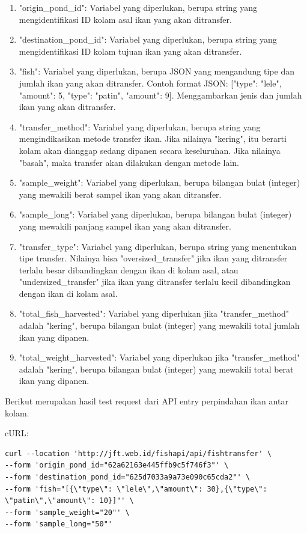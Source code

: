 \begin{enumerate}[1.]
\begin{enumerate}
\item "origin\_pond\_id": Variabel yang diperlukan, berupa string yang mengidentifikasi ID kolam asal ikan yang akan ditransfer.
\item "destination\_pond\_id": Variabel yang diperlukan, berupa string yang mengidentifikasi ID kolam tujuan ikan yang akan ditransfer.
\item "fish": Variabel yang diperlukan, berupa JSON yang mengandung tipe dan jumlah ikan yang akan ditransfer. Contoh format JSON: [{"type": "lele", "amount": 5}, {"type": "patin", "amount": 9}]. Menggambarkan jenis dan jumlah ikan yang akan ditransfer.
\item "transfer\_method": Variabel yang diperlukan, berupa string yang mengindikasikan metode transfer ikan. Jika nilainya "kering", itu berarti kolam akan dianggap sedang dipanen secara keseluruhan. Jika nilainya "basah", maka transfer akan dilakukan dengan metode lain.
\item "sample\_weight": Variabel yang diperlukan, berupa bilangan bulat (integer) yang mewakili berat sampel ikan yang akan ditransfer.
\item "sample\_long": Variabel yang diperlukan, berupa bilangan bulat (integer) yang mewakili panjang sampel ikan yang akan ditransfer.
\item "transfer\_type": Variabel yang diperlukan, berupa string yang menentukan tipe transfer. Nilainya bisa "oversized\_transfer" jika ikan yang ditransfer terlalu besar dibandingkan dengan ikan di kolam asal, atau "undersized\_transfer" jika ikan yang ditransfer terlalu kecil dibandingkan dengan ikan di kolam asal.
\item "total\_fish\_harvested": Variabel yang diperlukan jika "transfer\_method" adalah "kering", berupa bilangan bulat (integer) yang mewakili total jumlah ikan yang dipanen.
\item "total\_weight\_harvested": Variabel yang diperlukan jika "transfer\_method" adalah "kering", berupa bilangan bulat (integer) yang mewakili total berat ikan yang dipanen.
\end{enumerate}

Berikut merupakan hasil test request dari API entry perpindahan ikan antar kolam.

cURL:

\begin{lstlisting}
curl --location 'http://jft.web.id/fishapi/api/fishtransfer' \
--form 'origin_pond_id="62a62163e445ffb9c5f746f3"' \
--form 'destination_pond_id="625d7033a9a73e090c65cda2"' \
--form 'fish="[{\"type\": \"lele\",\"amount\": 30},{\"type\": \"patin\",\"amount\": 10}]"' \
--form 'sample_weight="20"' \
--form 'sample_long="50"'
\end{lstlisting}


\end{enumerate}
